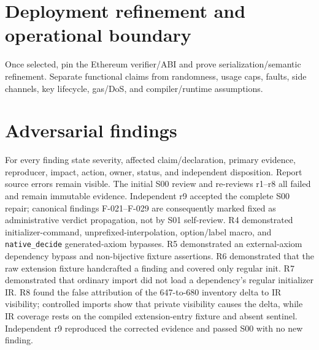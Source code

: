 \documentclass[11pt]{article}
\begin{document}
\section{Deployment refinement and operational boundary}
Once selected, pin the Ethereum verifier/ABI and prove serialization/semantic refinement. Separate
functional claims from randomness, usage caps, faults, side channels, key lifecycle, gas/DoS, and
compiler/runtime assumptions.

\section{Adversarial findings}
For every finding state severity, affected claim/declaration, primary evidence, reproducer, impact,
action, owner, status, and independent disposition. Report source errors remain visible.
The initial S00 review and re-reviews r1--r8 all failed and remain immutable evidence. Independent
r9 accepted the complete S00 repair; canonical findings F-021--F-029 are consequently marked fixed
as administrative verdict propagation, not by S01 self-review. R4 demonstrated
initializer-command, unprefixed-interpolation, option/label macro, and \texttt{native\_decide}
generated-axiom bypasses. R5 demonstrated an external-axiom dependency bypass and non-bijective
fixture assertions. R6 demonstrated that the raw extension fixture handcrafted a finding and covered
only regular init. R7 demonstrated that ordinary import did not load a dependency's regular
initializer IR. R8 found the false attribution of the 647-to-680 inventory delta to IR visibility;
controlled imports show that private visibility causes the delta, while IR coverage rests on the
compiled extension-entry fixture and absent sentinel. Independent r9 reproduced the corrected
evidence and passed S00 with no new finding.
\end{document}
